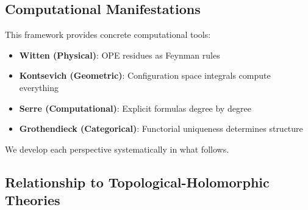 \subsection{Computational Manifestations}

This framework provides concrete computational tools:

\begin{itemize}
\item \textbf{Witten (Physical)}: OPE residues as Feynman rules
\item \textbf{Kontsevich (Geometric)}: Configuration space integrals compute everything
\item \textbf{Serre (Computational)}: Explicit formulas degree by degree
\item \textbf{Grothendieck (Categorical)}: Functorial uniqueness determines structure
\end{itemize}

We develop each perspective systematically in what follows.

\subsection{Relationship to Topological-Holomorphic Theories}
\label{subsec:topological-holomorphic-distinction}

